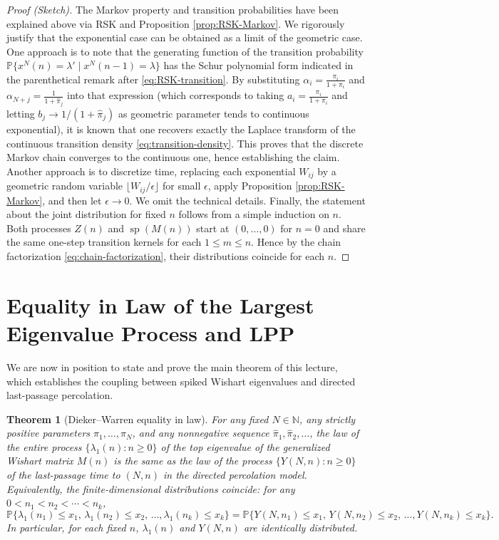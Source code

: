 \documentclass[letterpaper,11pt,oneside,reqno]{article}
\numberwithin{equation}{section}
\newtheorem{theorem}[proposition]{Theorem}
\theoremstyle{definition}
\begin{document}
\begin{proof}[Proof (Sketch)]
The Markov property and transition probabilities have been explained above via RSK and Proposition \ref{prop:RSK-Markov}. We rigorously justify that the exponential case can be obtained as a limit of the geometric case. One approach is to note that the generating function of the transition probability $\mathbb{P}\{x^N(n)=\lambda' \mid x^N(n-1)=\lambda\}$ has the Schur polynomial form indicated in the parenthetical remark after \eqref{eq:RSK-transition}. By substituting $\alpha_i = \frac{\pi_i}{1+\pi_i}$ and $\alpha_{N+j} = \frac{1}{1+\hat\pi_j}$ into that expression (which corresponds to taking $a_i = \frac{\pi_i}{1+\pi_i}$ and letting $b_j\to 1/(1+\hat\pi_j)$ as geometric parameter tends to continuous exponential), it is known \cite[Eq.~(4.2)]{DiekerWarren2009} that one recovers exactly the Laplace transform of the continuous transition density \eqref{eq:transition-density}. This proves that the discrete Markov chain converges to the continuous one, hence establishing the claim. Another approach is to discretize time, replacing each exponential $W_{ij}$ by a geometric random variable $\lfloor W_{ij}/\epsilon \rfloor$ for small $\epsilon$, apply Proposition \ref{prop:RSK-Markov}, and then let $\epsilon\to0$. We omit the technical details. Finally, the statement about the joint distribution for fixed $n$ follows from a simple induction on $n$. Both processes $Z(n)$ and $\operatorname{sp}(M(n))$ start at $(0,\dots,0)$ for $n=0$ and share the same one-step transition kernels for each $1\le m\le n$. Hence by the chain factorization \eqref{eq:chain-factorization}, their distributions coincide for each $n$.
\end{proof}

\section{Equality in Law of the Largest Eigenvalue Process and LPP}
We are now in position to state and prove the main theorem of this lecture, which establishes the coupling between spiked Wishart eigenvalues and directed last-passage percolation.

\begin{theorem}[Dieker--Warren \cite{DiekerWarren2009} equality in law]\label{thm:MainEquality}
For any fixed $N\in \mathbb{N}$, any strictly positive parameters $\pi_1,\dots,\pi_N$, and any nonnegative sequence $\hat\pi_1,\hat\pi_2,\dots$, the law of the entire process $\{\lambda_1(n): n\ge0\}$ of the top eigenvalue of the generalized Wishart matrix $M(n)$ is the same as the law of the process $\{Y(N,n): n\ge0\}$ of the last-passage time to $(N,n)$ in the directed percolation model. Equivalently, the finite-dimensional distributions coincide: for any $0<n_1<n_2<\cdots<n_k$,
\[ \mathbb{P}\{\lambda_1(n_1)\le x_1,\, \lambda_1(n_2)\le x_2,\,\dots, \lambda_1(n_k)\le x_k \} = \mathbb{P}\{Y(N,n_1)\le x_1,\, Y(N,n_2)\le x_2,\,\dots, Y(N,n_k)\le x_k \}. \]
In particular, for each fixed $n$, $\lambda_1(n)$ and $Y(N,n)$ are identically distributed.
\end{theorem}
\end{document}
